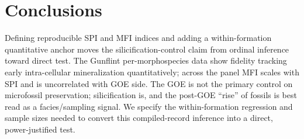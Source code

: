 \documentclass[11pt]{article}
\begin{document}
\section{Conclusions}
Defining reproducible SPI and MFI indices and adding a within-formation quantitative anchor moves
the silicification-control claim from ordinal inference toward direct test. The Gunflint
per-morphospecies data show fidelity tracking early intra-cellular mineralization quantitatively;
across the panel MFI scales with SPI and is uncorrelated with GOE side. The GOE is not the primary
control on microfossil preservation; silicification is, and the post-GOE ``rise'' of fossils is best
read as a facies/sampling signal. We specify the within-formation regression and sample sizes needed
to convert this compiled-record inference into a direct, power-justified test.
\end{document}
